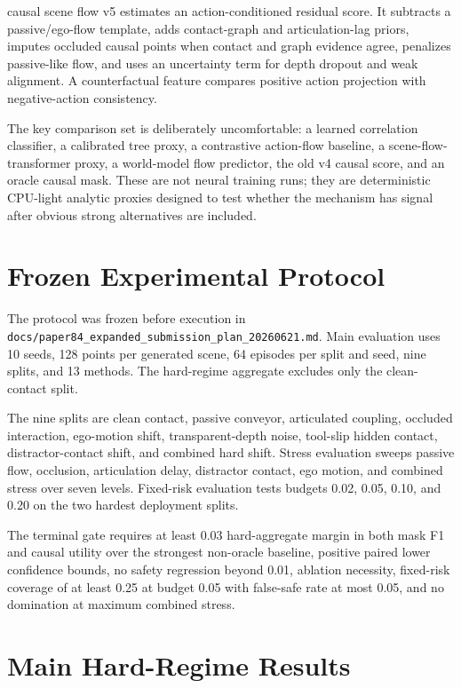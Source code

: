 \documentclass{article}
\newcommand{\methodname}{causal scene flow v5}
\begin{document}
\methodname{} estimates an action-conditioned residual score. It subtracts a passive/ego-flow template, adds contact-graph and articulation-lag priors, imputes occluded causal points when contact and graph evidence agree, penalizes passive-like flow, and uses an uncertainty term for depth dropout and weak alignment. A counterfactual feature compares positive action projection with negative-action consistency.

The key comparison set is deliberately uncomfortable: a learned correlation classifier, a calibrated tree proxy, a contrastive action-flow baseline, a scene-flow-transformer proxy, a world-model flow predictor, the old v4 causal score, and an oracle causal mask. These are not neural training runs; they are deterministic CPU-light analytic proxies designed to test whether the mechanism has signal after obvious strong alternatives are included.

\section{Frozen Experimental Protocol}

The protocol was frozen before execution in \texttt{docs/paper84\_expanded\_submission\_plan\_20260621.md}. Main evaluation uses 10 seeds, 128 points per generated scene, 64 episodes per split and seed, nine splits, and 13 methods. The hard-regime aggregate excludes only the clean-contact split.

The nine splits are clean contact, passive conveyor, articulated coupling, occluded interaction, ego-motion shift, transparent-depth noise, tool-slip hidden contact, distractor-contact shift, and combined hard shift. Stress evaluation sweeps passive flow, occlusion, articulation delay, distractor contact, ego motion, and combined stress over seven levels. Fixed-risk evaluation tests budgets 0.02, 0.05, 0.10, and 0.20 on the two hardest deployment splits.

The terminal gate requires at least 0.03 hard-aggregate margin in both mask F1 and causal utility over the strongest non-oracle baseline, positive paired lower confidence bounds, no safety regression beyond 0.01, ablation necessity, fixed-risk coverage of at least 0.25 at budget 0.05 with false-safe rate at most 0.05, and no domination at maximum combined stress.

\section{Main Hard-Regime Results}
\end{document}

